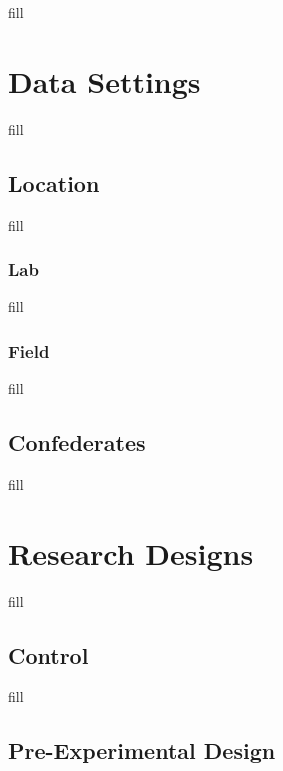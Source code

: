 \documentclass[
  b5paper]{book}
\begin{document}
fill

\hypertarget{data-settings}{%
\section{Data Settings}\label{data-settings}}

fill

\hypertarget{location}{%
\subsection*{Location}\label{location}}

fill

\hypertarget{lab}{%
\subsubsection*{Lab}\label{lab}}

fill

\hypertarget{field}{%
\subsubsection*{Field}\label{field}}

fill

\hypertarget{confederates}{%
\subsection*{Confederates}\label{confederates}}

fill

\hypertarget{research-designs}{%
\section{Research Designs}\label{research-designs}}

fill

\hypertarget{control}{%
\subsection*{Control}\label{control}}

fill

\hypertarget{pre-experimental-design}{%
\subsection*{Pre-Experimental Design}\label{pre-experimental-design}}
\end{document}

